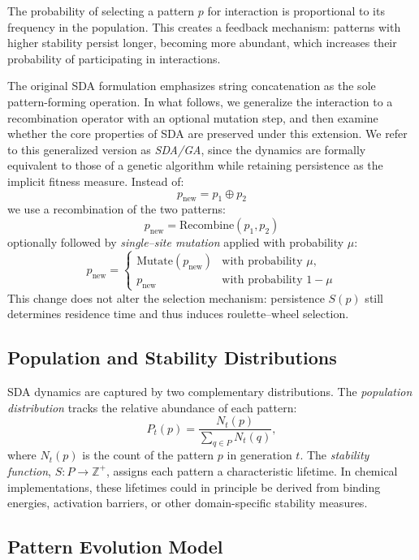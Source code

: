 \documentclass[life,article,submit,pdftex,moreauthors]{Definitions/mdpi}
\begin{document}
The probability of selecting a pattern $p$ for interaction is proportional to its frequency in the population. This creates a feedback mechanism: patterns with higher stability persist longer, becoming more abundant, which increases their probability of participating in interactions.

The original SDA formulation emphasizes string concatenation as the sole
pattern-forming operation. In what follows, we generalize the interaction 
to a recombination operator with an optional mutation step, and then examine 
whether the core properties of SDA are preserved under this extension. 
We refer to this generalized version as \textit{SDA/GA}, since the dynamics 
are formally equivalent to those of a genetic algorithm while retaining 
persistence as the implicit fitness measure. Instead of:
\[
p_{\text{new}} = p_1 \oplus p_2
\]
we use a recombination of the two patterns:
\[
p_{\text{new}} = \mathrm{Recombine}(p_1, p_2)
\]
optionally followed by \emph{single–site mutation} applied with probability $\mu$:
\[
p_{\text{new}} =
\begin{cases}
\mathrm{Mutate}(p_{\text{new}}) & \text{with probability } \mu,\\
p_{\text{new}} & \text{with probability } 1-\mu
\end{cases}
\]
This change does not alter the selection mechanism: persistence $S(p)$ still 
determines residence time and thus induces roulette–wheel selection.


\subsection{Population and Stability Distributions}

SDA dynamics are captured by two complementary distributions. 
The \textit{population distribution} tracks the relative abundance of each pattern:
\begin{equation}
P_t(p) = \frac{N_t(p)}{\sum_{q \in P} N_t(q)},
\end{equation}
where $N_t(p)$ is the count of the pattern $p$ in generation $t$. 
The \textit{stability function}, $S: P \rightarrow \mathbb{Z}^+$, assigns each pattern a characteristic lifetime. 
In chemical implementations, these lifetimes could in principle be derived from binding energies, activation barriers, or other domain-specific stability measures.

\subsection{Pattern Evolution Model}
\end{document}
